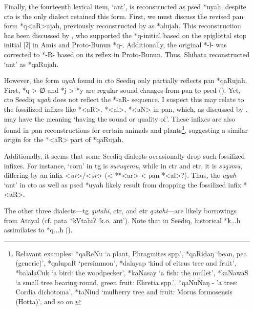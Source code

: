 
Finally, the fourteenth lexical item, `ant', is reconstructed as \acl{psed} *uyah, despite \acl{cto} is the only dialect retained this form. First, we must discuss the revised \acs{pan} form *q<aR>ujah, previously reconstructed by \textcite{ACD} as *alujah. This reconstruction has been discussed by \textcite[146--47]{shibata2020pbun}, who supported the *q-initial based on the epiglottal stop initial [ʡ] in Amis and Proto-Bunun *q-. Additionally, the original *-l- was corrected to *-R- based on its reflex in Proto-Bunun. Thus, Shibata reconstructed `ant' as *qaRujah.

However, the form \textit{uyah} found in \acl{cto} Seediq only partially reflects \acs{pan} *qaRujah. First, *q > ∅ and *j > *y are regular sound changes from \acs{pan} to \acl{psed} (\cite{song2023Aicgprime,song2024sedq}). Yet, \acl{cto} Seediq \textit{uyah} does not reflect the *-aR- sequence. I suspect this may relate to the fossilized infixes like *<aR>, *<al>, *<aN> in \acl{pan}, which, as discussed by \textcite{li_tsuchida2009_AnInfixes}, may have the meaning `having the sound or quality of'. These infixes are also found in \acl{pan} reconstructions for certain animals and plants\footnote{Relavant examples: *qaReNu `a plant, Phragmites spp.', *qaRidaŋ `bean, pea (generic)', *qalupaR `persimmon', *dalayap `kind of citrus tree and fruit', *balalaCuk `a bird: the woodpecker', *kaNasay `a fish: the mullet', *kaNawaS `a small tree bearing round, green fruit: Ehretia spp.', *qaNuNaŋ - 'a tree: Cordia dichotoma', *taNiud `mulberry tree and fruit: Morus formosensis (Hotta)', and so on.}, suggesting a similar origin for the *<aR> part of *qaRujah. 

Additionally, it seems that some Seediq dialects occasionally drop such fossilized infixes. For instance, `corn' in \acl{tg} is \textit{suruqemu}, while in \acl{ctr} and \acl{etr}, it is \textit{səqəmu}, differing by an infix <\textit{ur}>/<\textit{ər}> (< **<ar> < \acs{pan} *<al>?). Thus, the \textit{uyah} `ant' in \acl{cto} as well as \acl{psed} *uyah likely result from dropping the fossilized infix *<aR>.

The other three dialects—\acl{tg} \textit{qutahi}, \acl{ctr}, and \acl{etr} \textit{qətahi}—are likely borrowings from Atayal (cf. \acl{pata} *kVtahiʔ `k.o. ant'). Note that in Seediq, historical *k...h assimilates to *q...h (\cite[247-48]{li1981paic}).

